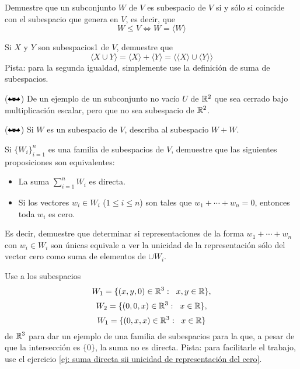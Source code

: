 


\begin{ej}
    Demuestre que un subconjunto
    $W$ de $V$ es subespacio de $V$ si y sólo si coincide con el subespacio
    que genera en $V$, es decir, que
    \[
    W \leq V \Leftrightarrow
    W = \langle W \rangle
    \]
\end{ej}

\begin{ej}
    Si $X$ y $Y$ son subespacios1 de $V$, demuestre que
    \[
    \langle X \cup Y \rangle =
    \langle X \rangle + \langle Y \rangle
    =
    \langle \langle X \rangle \cup \langle Y \rangle \rangle
    \]
    Pista: para la segunda igualdad, simplemente use la definición de 
    suma de subespacios.
\end{ej}

\begin{ej}
($\mathbat$) De un ejemplo de un subconjunto no vacío
$U$ de $\mathbb{R}^{2}$ que sea cerrado bajo multiplicación escalar,
pero que no sea subespacio de $\mathbb{R}^{2}$.
\end{ej}

\begin{ej}
($\mathbat$) Si $W$ es un subespacio de $V$, describa
al subespacio $W + W$.
\end{ej}

\begin{ej}
    \label{ej: suma directa sii unicidad de representación del cero}
    Si $\{ W_{i} \}_{i=1}^{n}$ es una familia de subespacios de $V$,
    demuestre que las siguientes proposiciones son equivalentes:
    \begin{itemize}
        \item La suma $\sum_{i=1}^{n} W_{i}$ es directa.
        \item Si los vectores $w_{i} \in W_{i}$ ($1 \leq i \leq n$)
        son tales que $w_{1} + \cdots + w_{n} = 0$, entonces 
        toda $w_{i}$ es cero.
    \end{itemize}
    Es decir, demuestre que determinar si representaciones de la forma
    $w_{1} + \cdots + w_{n}$ con $w_{i} \in W_{i}$ son únicas equivale
    a ver la unicidad de la representación sólo del vector cero como suma
    de elementos de $\cup W_{i}$.
\end{ej}

\begin{ej}
	\label{ej: de la suma directa}
    Use a los subespacios
    \[
    W_{1} = \{ (x, y, 0) \in  \mathbb{R}^{3} : \hspace{0.2cm} x, y \in \mathbb{R} \},
    \]
    \[
    W_{2} = \{ (0, 0, x) \in  \mathbb{R}^{3} : \hspace{0.2cm} x \in \mathbb{R} \},
    \]
    \[
    W_{1} = \{ (0, x, x) \in  \mathbb{R}^{3} : \hspace{0.2cm} x \in \mathbb{R} \}
    \]
    de $\mathbb{R}^{3}$ para dar un ejemplo de una familia de subespacios para la
    que, a pesar de que la intersección es $\{0\}$, la suma no es directa.
    Pista: para facilitarle el trabajo, use el ejercicio 
    \ref{ej: suma directa sii unicidad de representación del cero}.
\end{ej}

